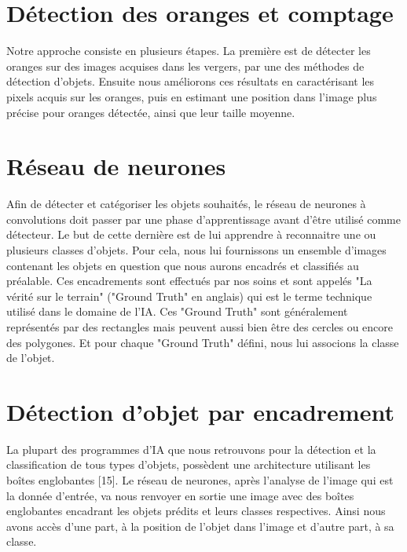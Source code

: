 \section{Détection des oranges et comptage}
Notre approche consiste en plusieurs étapes. La première est de détecter les oranges sur des images acquises dans les vergers, par une des méthodes de détection d’objets. Ensuite nous améliorons ces résultats en caractérisant les pixels acquis sur les oranges, puis en estimant une position  dans l’image plus précise pour oranges détectée, ainsi que leur taille moyenne.

\section{Réseau de neurones}

Afin de détecter et catégoriser les objets souhaités, le réseau de neurones à convolutions doit passer par une phase d’apprentissage avant d’être utilisé comme détecteur. Le but de cette dernière est de lui apprendre à reconnaitre une ou plusieurs classes d’objets. Pour cela, nous lui fournissons un ensemble d’images contenant les objets en question que nous aurons encadrés et classifiés au préalable. Ces encadrements sont effectués par nos soins et sont appelés "La vérité sur le terrain" ("Ground Truth" en anglais) qui est le terme technique utilisé dans le domaine de l’IA. Ces "Ground Truth" sont généralement représentés par des rectangles mais peuvent aussi bien être des cercles ou encore des polygones. Et pour chaque "Ground Truth" défini, nous lui associons la classe de l’objet.

\section{Détection d'objet par encadrement}
La plupart des programmes d’IA que nous retrouvons pour la détection et la classification de tous types d’objets, possèdent une architecture utilisant les boîtes englobantes [15]. Le réseau de neurones, après l’analyse de l’image qui est la donnée d’entrée, va nous renvoyer en sortie une image avec des boîtes englobantes encadrant les objets prédits et leurs classes respectives. Ainsi nous avons accès d’une part, à la position de l’objet dans l’image et d’autre part, à sa classe.




